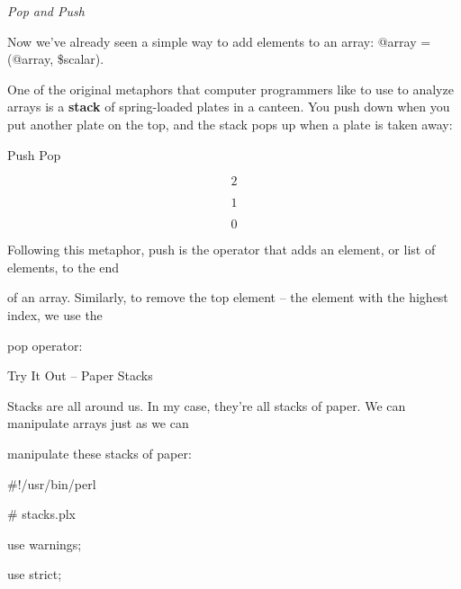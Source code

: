 \documentclass[a4paper,11pt]{book}
\begin{document}
\noindent 

\noindent \textit{Pop and Push}

\noindent Now we've already seen a simple way to add elements to an array: @array = (@array, \$scalar).

\noindent 

\noindent One of the original metaphors that computer programmers like to use to analyze arrays is a \textbf{stack }of spring-loaded plates in a canteen. You push down when you put another plate on the top, and the stack pops up when a plate is taken away:

\noindent 

\noindent 

\noindent 

\noindent Push Pop

\noindent 

\noindent 

\noindent 

\noindent 

\noindent 

\[2\] 


\[1\] 


\[0\] 


\noindent 

\noindent 

\noindent 

\noindent 

\noindent Following this  metaphor,  push is  the  operator  that  adds  an  element,  or  list  of  elements,  to  the  end

\noindent of an array.  Similarly,  to  remove  the  top  element  --  the  element  with  the highest  index,  we  use  the

\noindent pop operator:

\noindent 

\noindent Try It Out -- Paper Stacks

\noindent 

\noindent Stacks are all around us. In my case, they're all stacks of paper. We can manipulate arrays just as we can

\noindent manipulate these stacks of paper:

\noindent 

\noindent \#!/usr/bin/perl

\noindent \# stacks.plx

\noindent use warnings;

\noindent use strict;

\noindent 
\end{document}
